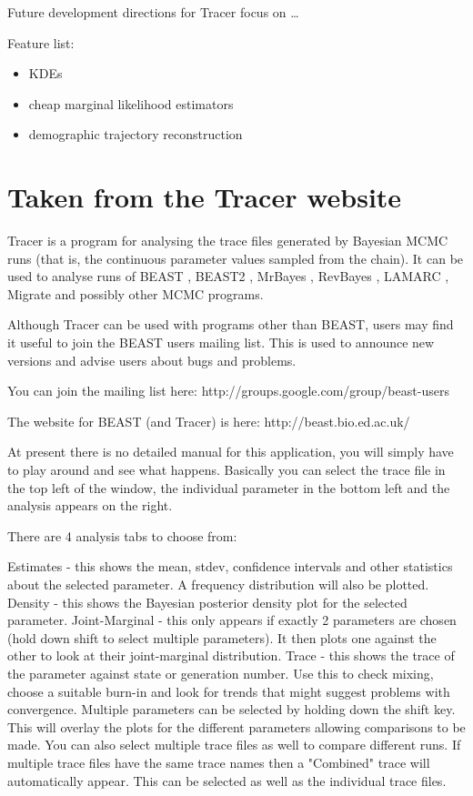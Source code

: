 \documentclass{bioinfo}
\begin{document}
Future development directions for Tracer focus on \ldots


Feature list:
\begin{itemize}
\item KDEs
\item cheap marginal likelihood estimators
\item demographic trajectory reconstruction
\end{itemize}

\section*{Taken from the Tracer website}

Tracer is a program for analysing the trace files generated by Bayesian MCMC runs (that is, the continuous parameter values sampled from the chain). It can be used to analyse runs of BEAST \citep{drummond2007beast,drummond2012bayesian}, BEAST2 \citep{bouckaert2014beast2}, MrBayes \citep{ronquist2012mrbayes}, RevBayes \citep{hohna2016revbayes}, LAMARC \citep{kuhner2006lamarc}, Migrate \citep{beerli2006comparison} and possibly other MCMC programs.

Although Tracer can be used with programs other than BEAST, users may find it useful to join the BEAST users mailing list. This is used to announce new versions and advise users about bugs and problems.

You can join the mailing list here:
http://groups.google.com/group/beast-users

The website for BEAST (and Tracer) is here:
http://beast.bio.ed.ac.uk/

At present there is no detailed manual for this application, you will simply have to play around and see what happens. Basically you can select the trace file in the top left of the window, the individual parameter in the bottom left and the analysis appears on the right.

There are 4 analysis tabs to choose from:

Estimates - this shows the mean, stdev, confidence intervals and other statistics about the selected parameter. A frequency distribution will also be plotted.
Density - this shows the Bayesian posterior density plot for the selected parameter.
Joint-Marginal - this only appears if exactly 2 parameters are chosen (hold down shift to select multiple parameters). It then plots one against the other to look at their joint-marginal distribution.
Trace - this shows the trace of the parameter against state or generation number. Use this to check mixing, choose a suitable burn-in and look for trends that might suggest problems with convergence.
Multiple parameters can be selected by holding down the shift key. This will overlay the plots for the different parameters allowing comparisons to be made. You can also select multiple trace files as well to compare different runs. If multiple trace files have the same trace names then a "Combined" trace will automatically appear. This can be selected as well as the individual trace files.
\end{document}
